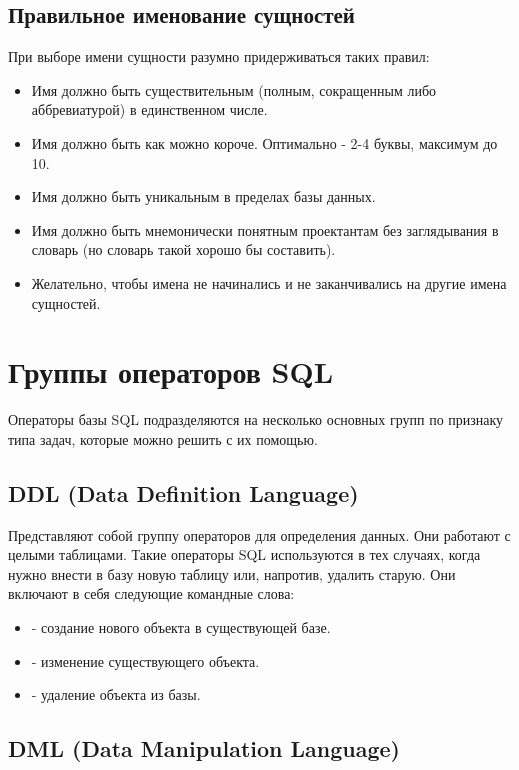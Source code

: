 \subsection{Правильное именование сущностей}

При выборе имени сущности разумно придерживаться таких правил:
\begin{itemize}
    \item Имя должно быть существительным (полным, сокращенным либо аббревиатурой) в единственном числе.
    \item Имя должно быть как можно короче. Оптимально - 2-4 буквы, максимум до 10.
    \item Имя должно быть уникальным в пределах базы данных.
    \item Имя должно быть мнемонически понятным проектантам без заглядывания в словарь (но словарь такой хорошо бы составить).
    \item Желательно, чтобы имена не начинались и не заканчивались на другие имена сущностей.
\end{itemize}

\section{Группы операторов SQL}

Операторы базы SQL подразделяются на несколько основных групп по признаку типа задач, которые можно решить с их помощью.

\subsection{DDL (Data Definition Language)}

Представляют собой группу операторов для определения данных. Они работают с целыми таблицами. Такие операторы SQL используются в тех случаях, когда нужно внести в базу новую таблицу или, напротив, удалить старую. Они включают в себя следующие командные слова:

\begin{itemize}
    \item {} - создание нового объекта в существующей базе.
    \item {} - изменение существующего объекта.
    \item {} - удаление объекта из базы.
\end{itemize}

\subsection{DML (Data Manipulation Language)}

